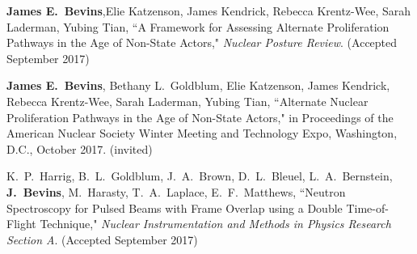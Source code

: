 \begin{bibsection}
  
\item \textbf{James E.\ Bevins},Elie Katzenson, James Kendrick, Rebecca Krentz-Wee, Sarah Laderman, Yubing Tian, ``A Framework for Assessing Alternate Proliferation Pathways in the Age of Non-State Actors," \textit{Nuclear Posture Review}. (Accepted September 2017)

\item \textbf{James E.\ Bevins}, Bethany L.\ Goldblum, Elie Katzenson, James Kendrick, Rebecca Krentz-Wee, Sarah Laderman, Yubing Tian, ``Alternate Nuclear Proliferation Pathways in the Age of Non-State Actors," in Proceedings of the American Nuclear Society Winter Meeting and Technology Expo, Washington, D.C., October 2017. (invited)


\item K.\ P.\ Harrig, B.\ L.\ Goldblum, J.\ A.\ Brown, D.\ L.\ Bleuel, L.\ A.\ Bernstein, \textbf{J.\ Bevins}, M.\ Harasty, T.\ A.\ Laplace, E.\ F.\ Matthews, ``Neutron Spectroscopy for Pulsed Beams with Frame Overlap using a Double Time-of-Flight Technique," \textit{Nuclear Instrumentation and Methods in Physics Research Section A}. (Accepted September 2017)
  

  


\end{bibsection}
